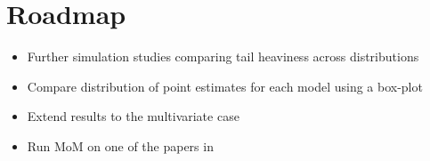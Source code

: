 \section{Roadmap}
\begin{itemize}
    \item Further simulation studies comparing tail heaviness across distributions
    \item Compare distribution of point estimates for each model using a box-plot
    \item Extend results to the multivariate case
    \item Run MoM on one of the papers in \cite{young2022consistency}
\end{itemize}